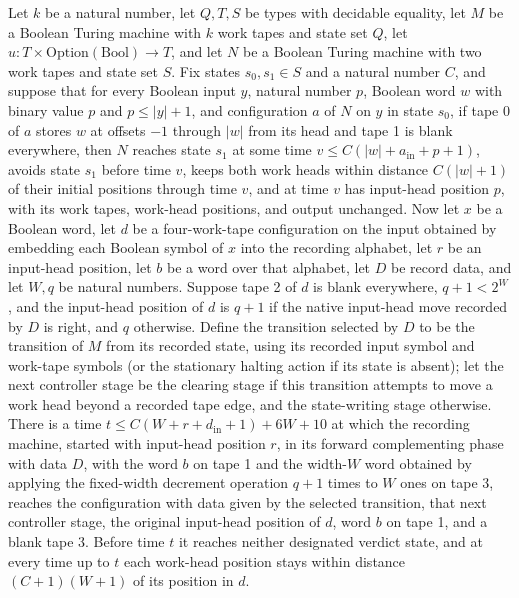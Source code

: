 \begin{theorem}
\label{Turing.recordStep_restore_native}
\leanok
{}
Let $k$ be a natural number, let $Q,T,S$ be types with decidable equality, let $M$ be a
Boolean Turing machine with $k$ work tapes and state set $Q$, let
$u:T\times\mathrm{Option}(\mathrm{Bool})\to T$, and let $N$ be a Boolean Turing machine
with two work tapes and state set $S$. Fix states $s_0,s_1\in S$ and a natural number
$C$, and suppose that for every Boolean input $y$, natural number $p$, Boolean word $w$
with binary value $p$ and $p\le |y|+1$, and configuration $a$ of $N$ on $y$ in state
$s_0$, if tape 0 of $a$ stores $w$ at offsets $-1$ through $|w|$ from its head and tape
1 is blank everywhere, then $N$ reaches state $s_1$ at some time $v\le
C(|w|+a_{\mathrm{in}}+p+1)$, avoids state $s_1$ before time $v$, keeps both work heads
within distance $C(|w|+1)$ of their initial positions through time $v$, and at time $v$
has input-head position $p$, with its work tapes, work-head positions, and output
unchanged. Now let $x$ be a Boolean word, let $d$ be a four-work-tape configuration on
the input obtained by embedding each Boolean symbol of $x$ into the recording alphabet,
let $r$ be an input-head position, let $b$ be a word over that alphabet, let $D$ be
record data, and let $W,q$ be natural numbers. Suppose tape 2 of $d$ is blank
everywhere, $q+1<2^W$, and the input-head position of $d$ is $q+1$ if the native
input-head move recorded by $D$ is right, and $q$ otherwise. Define the transition
selected by $D$ to be the transition of $M$ from its recorded state, using its recorded
input symbol and work-tape symbols (or the stationary halting action if its state is
absent); let the next controller stage be the clearing stage if this transition attempts
to move a work head beyond a recorded tape edge, and the state-writing stage otherwise.
There is a time $t\le C(W+r+d_{\mathrm{in}}+1)+6W+10$ at which the recording machine,
started with input-head position $r$, in its forward complementing phase with data $D$,
with the word $b$ on tape 1 and the width-$W$ word obtained by applying the fixed-width
decrement operation $q+1$ times to $W$ ones on tape 3, reaches the configuration with
data given by the selected transition, that next controller stage, the original
input-head position of $d$, word $b$ on tape 1, and a blank tape 3. Before time $t$ it
reaches neither designated verdict state, and at every time up to $t$ each work-head
position stays within distance $(C+1)(W+1)$ of its position in $d$.
\end{theorem}

